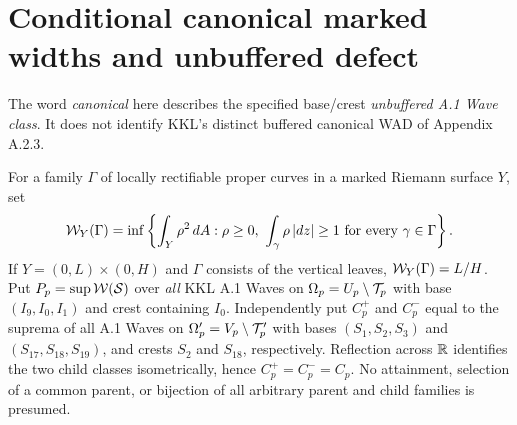 \section{Conditional canonical marked widths and unbuffered defect}
\label{sec:wave-proofs}
The word \emph{canonical} here describes the
specified base/crest \emph{unbuffered A.1 Wave class}.
It does not identify KKL's distinct
buffered canonical WAD of Appendix A.2.3.

\begin{definition}
For a family $\Gamma$ of locally rectifiable proper
curves in a marked Riemann surface $Y$, set
\begin{equation}\label{eq:width}
 \mathcal W_Y(\Gamma)=
 \inf\left\{\int_Y\rho^2\,dA:
    \rho\ge0,\ \int_\gamma\rho\,|dz|\ge1
       \text{ for every }\gamma\in\Gamma\right\}.
\end{equation}
If $Y=(0,L)\times(0,H)$ and $\Gamma$ consists
of the vertical leaves, $\mathcal W_Y(\Gamma)=L/H$.
Put $P_p=\sup\mathcal W(\mathcal S)$ over \emph{all}
KKL A.1 Waves on $\Omega_p=U_p\setminus\mathcal T_p$
with base $(I_9,I_0,I_1)$ and crest
containing $I_0$.  Independently put
$C_p^+$ and $C_p^-$ equal to the suprema
of all A.1 Waves on
$\Omega'_p=V_p\setminus\mathcal T'_p$
with bases $(S_1,S_2,S_3)$ and
$(S_{17},S_{18},S_{19})$, and crests
$S_2$ and $S_{18}$, respectively.
Reflection across $\mathbb R$ identifies
the two child classes isometrically,
hence $C_p^+=C_p^-=C_p$.
No attainment, selection of a
common parent, or bijection of
all arbitrary parent and child
families is presumed.
\end{definition}

